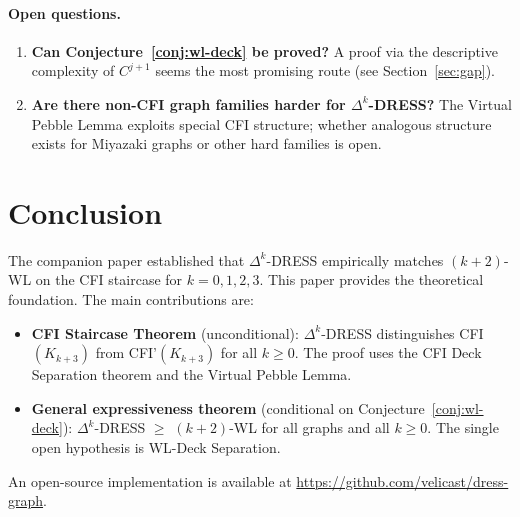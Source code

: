 \documentclass[11pt,a4paper]{article}
\begin{document}
\paragraph{Open questions.}
\begin{enumerate}
    \item \textbf{Can Conjecture~\ref{conj:wl-deck} be proved?} A proof via the descriptive complexity of $C^{j+1}$ seems the most promising route (see Section~\ref{sec:gap}).
    \item \textbf{Are there non-CFI graph families harder for $\Delta^k$-DRESS?} The Virtual Pebble Lemma exploits special CFI structure; whether analogous structure exists for Miyazaki graphs or other hard families is open.
    \end{enumerate}

\section{Conclusion}

The companion paper \cite{castrillo2026dress} established that $\Delta^k$-DRESS empirically matches $(k{+}2)$-WL on the CFI staircase for $k = 0, 1, 2, 3$. This paper provides the theoretical foundation. The main contributions are:

\begin{itemize}
    \item \textbf{CFI Staircase Theorem} (unconditional): $\Delta^k$-DRESS distinguishes CFI$(K_{k+3})$ from CFI'$(K_{k+3})$ for all $k \geq 0$. The proof uses the CFI Deck Separation theorem and the Virtual Pebble Lemma.
    \item \textbf{General expressiveness theorem} (conditional on Conjecture~\ref{conj:wl-deck}): $\Delta^k$-DRESS $\geq$ $(k{+}2)$-WL for all graphs and all $k \geq 0$. The single open hypothesis is WL-Deck Separation.
\end{itemize}

An open-source implementation is available at \url{https://github.com/velicast/dress-graph}.



\end{document}
